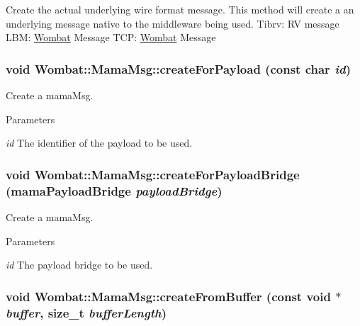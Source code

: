 Create the actual underlying wire format message. This method will create a an underlying message native to the middleware being used. Tibrv: RV message LBM: \hyperlink{namespaceWombat}{Wombat} Message TCP: \hyperlink{namespaceWombat}{Wombat} Message \hypertarget{classWombat_1_1MamaMsg_ac52ce35f2a056b274ddef0853f867024}{
\subsubsection[{createForPayload}]{\setlength{\rightskip}{0pt plus 5cm}void Wombat::MamaMsg::createForPayload (const char {\em id})}}
\label{classWombat_1_1MamaMsg_ac52ce35f2a056b274ddef0853f867024}


Create a mamaMsg. 
\begin{DoxyParams}{Parameters}
\item[{\em id}]The identifier of the payload to be used. \end{DoxyParams}
\hypertarget{classWombat_1_1MamaMsg_aea527bd1d49e7c9c074dd28dec412755}{
\subsubsection[{createForPayloadBridge}]{\setlength{\rightskip}{0pt plus 5cm}void Wombat::MamaMsg::createForPayloadBridge (mamaPayloadBridge {\em payloadBridge})}}
\label{classWombat_1_1MamaMsg_aea527bd1d49e7c9c074dd28dec412755}


Create a mamaMsg. 
\begin{DoxyParams}{Parameters}
\item[{\em id}]The payload bridge to be used. \end{DoxyParams}
\hypertarget{classWombat_1_1MamaMsg_a1d0ba5880a0573a4689ee1d3f1d81a1b}{
\subsubsection[{createFromBuffer}]{\setlength{\rightskip}{0pt plus 5cm}void Wombat::MamaMsg::createFromBuffer (const void $\ast$ {\em buffer}, \/  size\_\-t {\em bufferLength})}}
\label{classWombat_1_1MamaMsg_a1d0ba5880a0573a4689ee1d3f1d81a1b}


